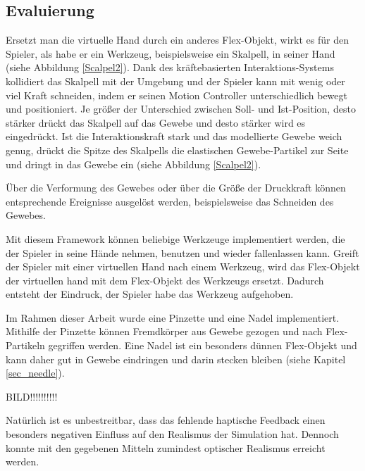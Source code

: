 \subsection{Evaluierung}
Ersetzt man die virtuelle Hand durch ein anderes Flex-Objekt, wirkt es für den Spieler, als habe er ein Werkzeug, beispielsweise ein Skalpell, in seiner Hand (siehe Abbildung \ref{Scalpel2}). 
Dank des kräftebasierten Interaktions-Systems kollidiert das Skalpell mit der Umgebung und der Spieler kann mit wenig oder viel Kraft schneiden, indem er seinen Motion Controller unterschiedlich bewegt und positioniert. Je größer der Unterschied zwischen Soll- und Ist-Position, desto stärker drückt das Skalpell auf das Gewebe und desto stärker wird es eingedrückt. Ist die Interaktionskraft stark und das modellierte Gewebe weich genug, drückt die Spitze des Skalpells die elastischen Gewebe-Partikel zur Seite und dringt in das Gewebe ein (siehe Abbildung \ref{Scalpel2}).


Über die Verformung des Gewebes oder über die Größe der Druckkraft können entsprechende Ereignisse ausgelöst werden, beispielsweise das Schneiden des Gewebes.

Mit diesem Framework können beliebige Werkzeuge implementiert werden, die der Spieler in seine Hände nehmen, benutzen und wieder fallenlassen kann. Greift der Spieler mit einer virtuellen Hand nach einem Werkzeug, wird das Flex-Objekt der virtuellen hand mit dem Flex-Objekt des Werkzeugs ersetzt. Dadurch entsteht der Eindruck, der Spieler habe das Werkzeug aufgehoben.

Im Rahmen dieser Arbeit wurde eine Pinzette und eine Nadel implementiert. Mithilfe der Pinzette können Fremdkörper aus Gewebe gezogen und nach Flex-Partikeln gegriffen werden. Eine Nadel ist ein besonders dünnen Flex-Objekt und kann daher gut in Gewebe eindringen und darin stecken bleiben (siehe Kapitel \ref{sec_needle}).

BILD!!!!!!!!!!

Natürlich ist es unbestreitbar, dass das fehlende haptische Feedback einen besonders negativen Einfluss auf den Realismus der Simulation hat. Dennoch konnte mit den gegebenen Mitteln zumindest optischer Realismus erreicht werden.


